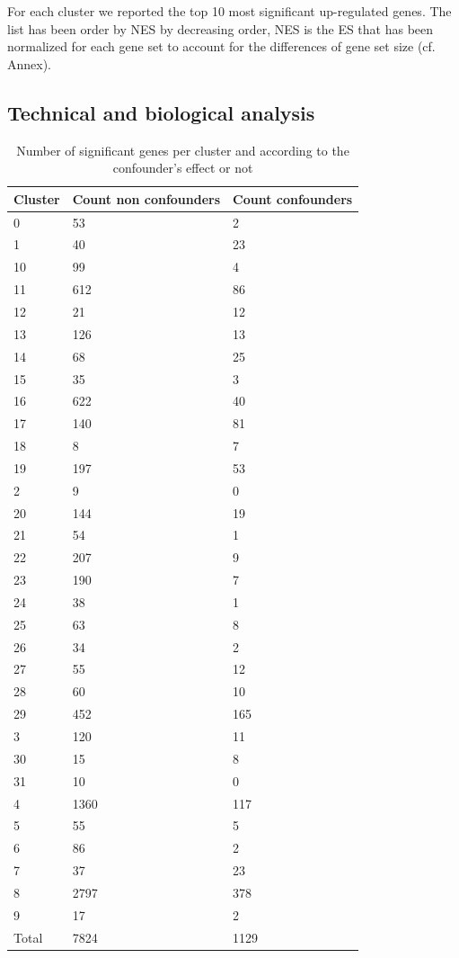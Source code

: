 \documentclass[a4paper, 11pt]{article}
\begin{document}
\begin{multicols}{2}
For each cluster we reported the top  10 most significant up-regulated genes. The list has been order by NES by decreasing order, NES is the ES that has been normalized for each gene set to account for the differences of gene set size (cf. Annex).

\subsection{Technical and biological analysis}

\begin{table}[H]
\begin{tabular}{lll}
Cluster & Count non confounders & Count confounders \\ \hline
0 & 53 & 2 \\
1 & 40 & 23 \\
10 & 99 & 4 \\
11 & 612 & 86 \\
12 & 21 & 12 \\
13 & 126 & 13 \\
14 & 68 & 25 \\
15 & 35 & 3 \\
16 & 622 & 40 \\
17 & 140 & 81 \\
18 & 8 & 7 \\
19 & 197 & 53 \\
2 & 9 & 0 \\
20 & 144 & 19 \\
21 & 54 & 1 \\
22 & 207 & 9 \\
23 & 190 & 7 \\
24 & 38 & 1 \\
25 & 63 & 8 \\
26 & 34 & 2 \\
27 & 55 & 12 \\
28 & 60 & 10 \\
29 & 452 & 165 \\
3 & 120 & 11 \\
30 & 15 & 8 \\
31 & 10 & 0 \\
4 & 1360 & 117 \\
5 & 55 & 5 \\
6 & 86 & 2 \\
7 & 37 & 23 \\
8 & 2797 & 378 \\
9 & 17 & 2 \\ \hline
Total & 7824 & 1129
\end{tabular}
\caption{Number of significant genes per cluster and according to the confounder's effect or not}
\label{tab:sigCount}
\end{table}


\end{multicols}
\end{document}
